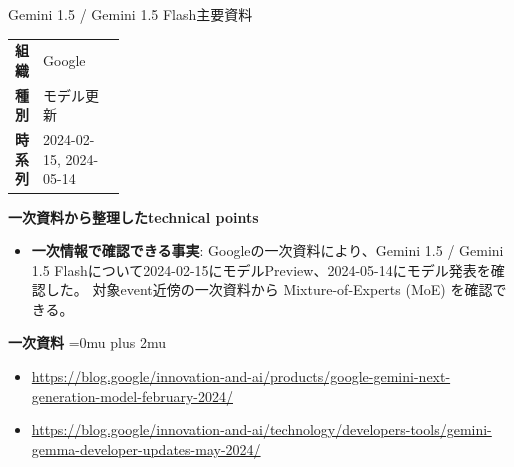 \Needspace{0.38\textheight}
\begin{technicalnote}{Gemini 1.5 / Gemini 1.5 Flash}{主要資料}
\begingroup
\begin{tabularx}{\linewidth}{@{}>{\bfseries}p{0.22\linewidth}X@{}}
組織 & Google \\
種別 & モデル更新 \\
時系列 & 2024-02-15, 2024-05-14 \\
\end{tabularx}
\smallskip
\begin{minipage}{\linewidth}
{\bfseries 一次資料から整理したtechnical points}
\begin{itemize}[leftmargin=1.5em,itemsep=0.35em]
\item \textbf{一次情報で確認できる事実}: Googleの一次資料により、Gemini 1.5 / Gemini 1.5 Flashについて2024-02-15にモデルPreview、2024-05-14にモデル発表を確認した。 対象event近傍の一次資料から Mixture-of-Experts (MoE) を確認できる。
\end{itemize}
\begin{minipage}{\linewidth}
\begin{samepage}
{\bfseries 一次資料}
\begingroup\sloppy
\Urlmuskip=0mu plus 2mu\relax
\begin{itemize}[leftmargin=1.5em,itemsep=0.25em]
\item {\scriptsize\url{https://blog.google/innovation-and-ai/products/google-gemini-next-generation-model-february-2024/}}
\item {\scriptsize\url{https://blog.google/innovation-and-ai/technology/developers-tools/gemini-gemma-developer-updates-may-2024/}}
\end{itemize}
\endgroup
\end{samepage}
\end{minipage}
\end{minipage}
\endgroup
\end{technicalnote}
\medskip

